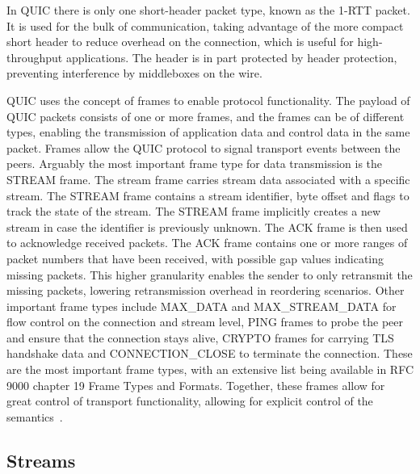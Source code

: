 \documentclass[english, 12pt, a4paper, elec, utf8, a-2b, online]{aaltothesis}
\begin{document}
In QUIC there is only one short-header packet type, known as the 1-RTT packet. It is
used for the bulk of communication, taking advantage of the more compact short
header to reduce overhead on the connection, which is useful for high-throughput
applications. The header is in part protected by header protection, preventing
interference by middleboxes on the wire.

QUIC uses the concept of frames to enable protocol functionality. The payload of
QUIC packets consists of one or more frames, and the frames can be of different types,
enabling the transmission of application data and control data in the same packet. Frames
allow the QUIC protocol to signal transport events between the peers. Arguably the most
important frame type for data transmission is the STREAM frame. The stream frame
carries stream data associated with a specific stream. The STREAM frame contains
a stream identifier, byte offset and flags to track the state of the stream. The STREAM
frame implicitly creates a new stream in case the identifier is previously unknown.
The ACK frame is then used to acknowledge received packets. The ACK frame contains
one or more ranges of packet numbers that have been received, with possible gap values
indicating missing packets. This higher granularity enables the sender to only retransmit
the missing packets, lowering retransmission overhead in reordering scenarios. Other
important frame types include MAX\_DATA and MAX\_STREAM\_DATA for flow control
on the connection and stream level, PING frames to probe the peer and ensure that
the connection stays alive, CRYPTO frames for carrying TLS handshake data and CONNECTION\_CLOSE
to terminate the connection. These are the most important frame types, with an
extensive list being available in RFC 9000 chapter 19 Frame Types and Formats. Together,
these frames allow for great control of transport functionality, allowing for explicit
control of the semantics~\cite{rfc9000}.

\subsection{Streams}
\end{document}
